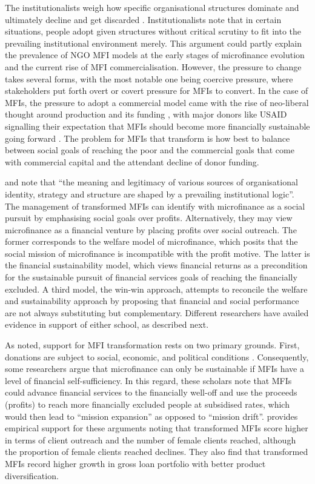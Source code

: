 \documentclass[a4paper, nobind]{templates/ociamthesis}
\begin{document}
The institutionalists weigh how specific organisational structures dominate and ultimately decline and get discarded \autocite{powell2012new}. Institutionalists note that in certain situations, people adopt given structures without critical scrutiny to fit into the prevailing institutional environment merely. This argument could partly explain the prevalence of NGO MFI models at the early stages of microfinance evolution and the current rise of MFI commercialisation. However, the pressure to change takes several forms, with the most notable one being coercive pressure, where stakeholders put forth overt or covert pressure for MFIs to convert. In the case of MFIs, the pressure to adopt a commercial model came with the rise of neo-liberal thought around production and its funding \autocite{bateman2010doesn}, with major donors like USAID signalling their expectation that MFIs should become more financially sustainable going forward \autocite{d2013unsubsidized}. The problem for MFIs that transform is how best to balance between social goals of reaching the poor and the commercial goals that come with commercial capital and the attendant decline of donor funding.

\textcite{thornton2002rise} and \textcite{thornton2015institutional} note that ``the meaning and legitimacy of various sources of organisational identity, strategy and structure are shaped by a prevailing institutional logic''. The management of transformed MFIs can identify with microfinance as a social pursuit by emphasising social goals over profits. Alternatively, they may view microfinance as a financial venture by placing profits over social outreach. The former corresponds to the welfare model of microfinance, which posits that the social mission of microfinance is incompatible with the profit motive. The latter is the financial sustainability model, which views financial returns as a precondition for the sustainable pursuit of financial services goals of reaching the financially excluded. A third model, the win-win approach, attempts to reconcile the welfare and sustainability approach by proposing that financial and social performance are not always substituting but complementary. Different researchers have availed evidence in support of either school, as described next.

As noted, support for MFI transformation rests on two primary grounds. First, donations are subject to social, economic, and political conditions \autocite{garmaise2013cheap,armendariz2013subsidy,d2017aid}. Consequently, some researchers argue that microfinance can only be sustainable if MFIs have a level of financial self-sufficiency. In this regard, these scholars note that MFIs could advance financial services to the financially well-off and use the proceeds (profits) to reach more financially excluded people at subsidised rates, which would then lead to ``mission expansion'' as opposed to ``mission drift''. \textcite{frank2008stemming} provides empirical support for these arguments noting that transformed MFIs score higher in terms of client outreach and the number of female clients reached, although the proportion of female clients reached declines. They also find that transformed MFIs record higher growth in gross loan portfolio with better product diversification.
\end{document}
